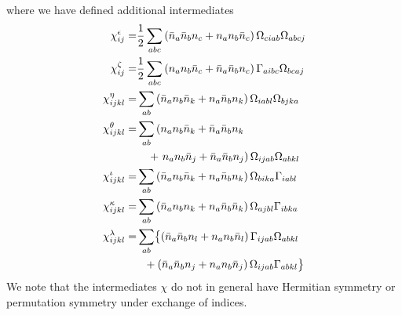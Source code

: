 \documentclass[11pt]{article}
\begin{document}
where we have defined additional intermediates
\begin{subequations}\allowdisplaybreaks[4]\label{chi_2b}
\begin{align}
\chi^{\epsilon}_{ij} =& \frac{1}{2} \sum_{abc} \left( \bar{n}_a \bar{n}_b {n}_c    +  {n}_a  {n}_b \bar{n}_c \right)  \Omega_{ciab} \Omega_{abcj} \\  %
%
\chi^{\zeta}_{ij}  =&\frac{1}{2} \sum_{abc} \left(    {n}_a {n}_b \bar{n}_c + \bar{n}_a  \bar{n}_b {n}_c \right) \Gamma_{aibc}  \Omega_{bcaj} \\   %
%
\chi^{\eta}_{ijkl} =& \sum_{ab} \left( \bar{n}_a  {n}_b  \bar{n}_k  +  {n}_a  \bar{n}_b  {n}_k \right)  \Omega_{iabl} \Omega_{bjka} \\    %
%
\chi^{\theta}_{ijkl}  =&  \sum_{ab} \left(   {n}_a {n}_b \bar{n}_k  +  \bar{n}_a  \bar{n}_b {n}_k \right. \nonumber\\
& ~~~+ \left.   {n}_a {n}_b \bar{n}_j + \bar{n}_a  \bar{n}_b {n}_j  \right)   \Omega_{ijab} \Omega_{abkl}  \\   %
\chi^{\iota}_{ijkl} =& \sum_{ab} \left(   \bar{n}_a {n}_b \bar{n}_k  +  {n}_a  \bar{n}_b  {n}_k \right)  \Omega_{bika} \Gamma_{iabl} \\     %
%
\chi^{\kappa}_{ijkl}  =&\sum_{ab} \left(   \bar{n}_a {n}_b {n}_k  +  {n}_a  \bar{n}_b  \bar{n}_k \right)  %
\Omega_{ajbl} \Gamma_{ibka} \\     %
%
\chi^{\lambda}_{ijkl}  =& \sum_{ab} \bigl\{ \left(   \bar{n}_a \bar{n}_b {n}_l +  {n}_a  {n}_b  \bar{n}_l \right)  \Gamma_{ijab} \Omega_{abkl}  \nonumber\\
                        &~~+   \left(   \bar{n}_a \bar{n}_b {n}_j +  {n}_a  {n}_b  \bar{n}_j \right)  \Omega_{ijab} \Gamma_{abkl} \bigr\}
\end{align}
\end{subequations}
We note that the intermediates $\chi$ do not in general have Hermitian symmetry or permutation symmetry under exchange of indices.
\end{document}
